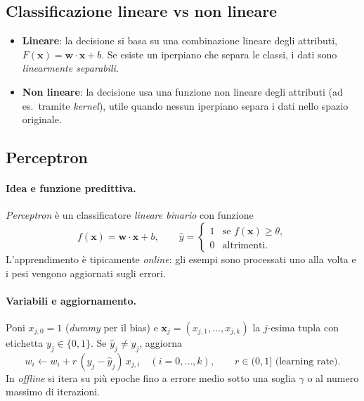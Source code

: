 \subsection{Classificazione lineare vs non lineare}\label{subsec:lin-nonlin}
\begin{itemize}
  \item \textbf{Lineare}: la decisione si basa su una combinazione lineare degli attributi, \(F(\mathbf{x})=\mathbf{w}\!\cdot\!\mathbf{x}+b\). Se esiste un iperpiano che separa le classi, i dati sono \emph{linearmente separabili}.
  \item \textbf{Non lineare}: la decisione usa una funzione non lineare degli attributi (ad es.\ tramite \emph{kernel}), utile quando nessun iperpiano separa i dati nello spazio originale.
\end{itemize}

\subsection{Perceptron}\label{subsec:perceptron}
\paragraph{Idea e funzione predittiva.}
\emph{Perceptron} è un classificatore \emph{lineare binario} con funzione
\[
f(\mathbf{x})=\mathbf{w}\!\cdot\!\mathbf{x}+b,\qquad 
\hat{y}=\begin{cases}
1 & \text{se } f(\mathbf{x})\ge \theta,\\
0 & \text{altrimenti.}
\end{cases}
\]
L’apprendimento è tipicamente \emph{online}: gli esempi sono processati uno alla volta e i pesi vengono aggiornati sugli errori. %

\paragraph{Variabili e aggiornamento.}
Poni \(x_{j,0}=1\) (\emph{dummy} per il bias) e \(\mathbf{x}_j=(x_{j,1},\dots,x_{j,k})\) la \(j\)-esima tupla con etichetta \(y_j\in\{0,1\}\). Se \(\hat{y}_j\neq y_j\), aggiorna
\[
w_i \leftarrow w_i + r\,(y_j-\hat{y}_j)\,x_{j,i}\quad (i=0,\dots,k),\qquad r\in(0,1] \text{ (learning rate)}.
\]
In \emph{offline} si itera su più epoche fino a errore medio sotto una soglia \(\gamma\) o al numero massimo di iterazioni. %

